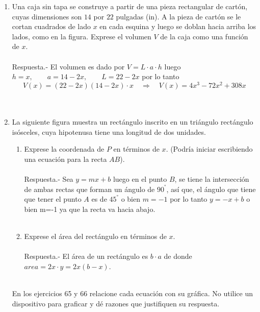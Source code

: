 \begin{enumerate}
    \item Una caja sin tapa se construye a partir de una pieza rectangular de cartón, cuyas dimensiones son $14$ por $22$ pulgadas (in). A la pieza de cartón se le cortan cuadrados de lado $x$ en cada esquina y luego se doblan hacia arriba los lados, como en la figura. Exprese el volumen $V$ de la caja como una función de $x$.\\\\
	Respuesta.-\; El volumen es dado por $V=L\cdot a\cdot h$ luego $h=x,\qquad a=14-2x, \qquad L=22-2x$ por lo tanto $$V(x)=(22-2x)(14-2x)\cdot x \quad \Longrightarrow \quad V(x)=4x^3 - 72x^2 + 308x$$\\\\

    \item La siguiente figura muestra un rectángulo inscrito en un triángulo rectángulo isósceles, cuya hipotenusa tiene una longitud de dos unidades.
    \begin{enumerate}[\bfseries a.]
	
	\item Exprese la coordenada de $P$ en términos de $x$. (Podría iniciar escribiendo una ecuación para la recta $AB$).\\\\
	    Respuesta.-\; Sea $y=mx+b$ luego en el punto $B$, se tiene la intersección de ambas rectas que forman un ángulo de $90^{°}$, así que, el ángulo que tiene que tener el punto $A$ es de $45^{°}$ o bien $m=-1$ por lo tanto $y=-x+b$ o bien m=-1 ya que la recta va hacia abajo.\\\\

	\item Exprese el área del rectángulo en términos de $x$.\\\\
	    Respuesta.-\; El área de un rectángulo es $b\cdot a$ de donde $area = 2x \cdot y = 2x(b-x)$.\\\\

    \end{enumerate}

    En los ejercicios 65 y 66 relacione cada ecuación con su gráfica. No utilice un dispositivo para graficar y dé razones que justifiquen su respuesta.\\\\


\end{enumerate}
